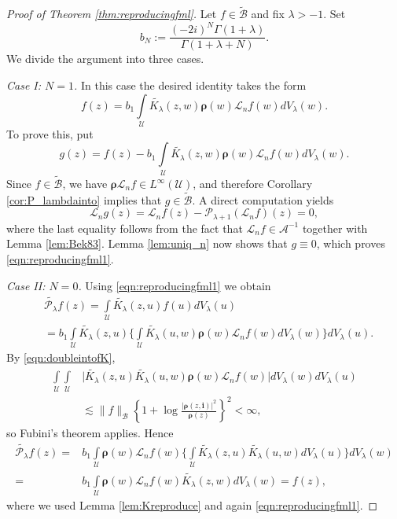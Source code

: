 \documentclass{amsart}
\numberwithin{equation}{section}
\newcommand{\bfL}{\mathcal{L}}
\newcommand{\calU}{\mathcal{U}}
\newcommand{\bfi}{\mathbf{i}}
\newcommand{\bfrho}{\boldsymbol{\rho}}
\newcommand{\calB}{\mathcal{B}}
\begin{document}
\begin{proof}[Proof of Theorem \ref{thm:reproducingfml}]
Let $f\in \widetilde{\calB}$ and fix $\lambda>-1$. Set
\[
b_N:=\frac{(-2i)^N\Gamma(1+\lambda)}{\Gamma(1+\lambda+N)}.
\]
We divide the argument into three cases.

\medskip
\noindent\textit{Case I: $N=1$.}
In this case the desired identity takes the form
\begin{equation}\label{eqn:reproducingfml1}
f(z) = b_1 \int\limits_{\calU} \widetilde{K_\lambda}(z,w) \bfrho(w) \bfL_n f(w) dV_\lambda(w).
\end{equation}
To prove this, put
\[
g(z) = f(z) - b_1 \int\limits_{\calU} \widetilde{K_\lambda}(z,w) \bfrho(w)  \bfL_n f(w) dV_\lambda(w).
\]
Since $f\in \widetilde{\calB}$, we have $\bfrho\bfL_n f\in L^{\infty}(\calU)$,
and therefore Corollary \ref{cor:P_lambdainto} implies that $g\in \widetilde{\calB}$.
A direct computation yields
\begin{equation*}\label{eqn:partg}
\bfL_n g (z) = \bfL_n f(z) - \mathcal{P}_{\lambda+1}(\bfL_nf)(z) = 0,
\end{equation*}
where the last equality follows from the fact that $\bfL_nf\in\mathcal{A}^{-1}$ together with  Lemma \ref{lem:Bek83}.
Lemma \ref{lem:uniq_n} now shows that $g\equiv 0$, which proves \eqref{eqn:reproducingfml1}.

\medskip
\noindent\textit{Case II: $N=0$.}
Using \eqref{eqn:reproducingfml1} we obtain
\begin{align*}
&\widetilde{\mathcal{P}_{\lambda}}f(z)=\int\limits_{\calU} \widetilde{K_\lambda}(z,u) f(u)dV_{\lambda}(u)\\
&=b_1 \int\limits_{\calU} \widetilde{K_\lambda}(z,u)
\bigg\{\int\limits_{\calU}  \widetilde{K_\lambda}(u,w) \bfrho(w) \bfL_n f(w) dV_\lambda(w)\bigg\} dV_{\lambda}(u).
\end{align*}
By \eqref{eqn:doubleintofK}, 
\begin{align*}
\int\limits_{\calU} \int\limits_{\calU}& \big|\widetilde{K_{\lambda}}(z,u) \widetilde{K_{\lambda}}(u,w)\bfrho(w) \bfL_n f(w) \big| dV_{\lambda}(w) dV_{\lambda}(u)\\
&\lesssim \|f\|_{\calB} \left\{1 + \log \frac {|\bfrho(z,\bfi)|^2} {\bfrho(z)}\right\}^2<\infty,
\end{align*}
so Fubini's theorem applies. Hence
\begin{align*}
\widetilde{\mathcal{P}_\lambda} f(z) =& b_1\int\limits_{\calU} \bfrho(w) \bfL_n f(w) \bigg\{\int\limits_{\calU} \widetilde{K_\lambda}(z,u) \widetilde{K_\lambda}(u,w) dV_{\lambda}(u) \bigg\} dV_{\lambda}(w)\\
=& b_1 \int\limits_{\calU} \bfrho(w) \bfL_n f(w)  \widetilde{K_\lambda}(z,w) dV_\lambda(w)= f(z),
\end{align*}
where we used Lemma \ref{lem:Kreproduce} and again \eqref{eqn:reproducingfml1}.


\end{proof}
\end{document}
